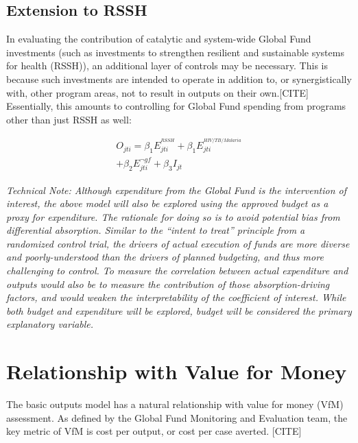 \documentclass[twocolumn]{bmcart}%
\begin{document}
\subsection{Extension to RSSH}
In evaluating the contribution of catalytic and system-wide Global Fund investments (such as investments to strengthen resilient and sustainable systems for health (RSSH)), an additional layer of controls may be necessary. This is because such investments are intended to operate in addition to, or synergistically with, other program areas, not to result in outputs on their own.[CITE] %
 Essentially, this amounts to controlling for Global Fund spending from programs other than just RSSH as well:

  \begin{align}
    O_{jti} = \beta_1 E^{^{RSSH}}_{jti} + \beta_1 E^{^{HIV/TB/Malaria}}_{jti} \\
    + \beta_2 E^{\neg gf}_{jti} + \beta_3 I_{jt}
  \end{align}

\textit{Technical Note: Although expenditure from the Global Fund is the intervention of interest, the above model will also be explored using the approved budget as a proxy for expenditure. The rationale for doing so is to avoid potential bias from differential absorption. Similar to the ``intent to treat'' principle from a randomized control trial, the drivers of actual execution of funds are more diverse and poorly-understood than the drivers of planned budgeting, and thus more challenging to control. To measure the correlation between actual expenditure and outputs would also be to measure the contribution of those absorption-driving factors, and would weaken the interpretability of the coefficient of interest. While both budget and expenditure will be explored, budget will be considered the primary explanatory variable.}


\section{Relationship with Value for Money} \label{vfm}
The basic outputs model has a natural relationship with value for money (VfM) assessment. As defined by the Global Fund Monitoring and Evaluation team, the key metric of VfM is cost per output, or cost per case averted. [CITE] \\
\end{document}
